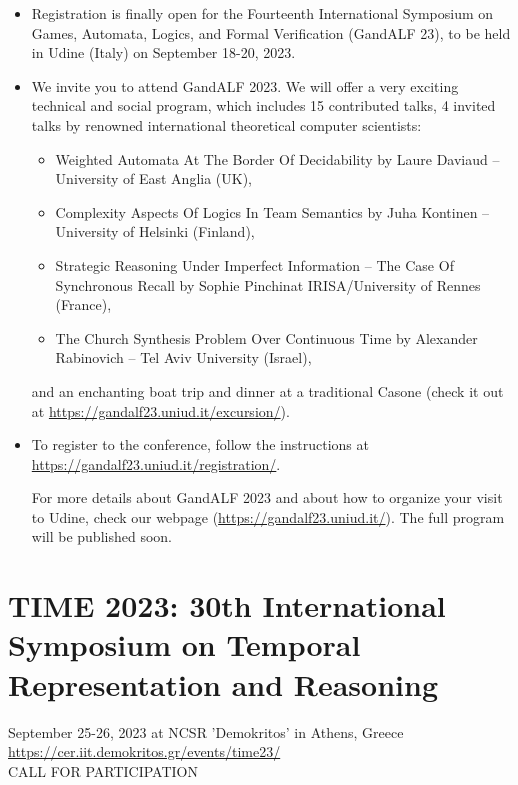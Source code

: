 \documentclass[prodmode,acmtecs]{acmsmall} %
\begin{document}
\begin{itemize}\item  Registration is finally open for the Fourteenth International Symposium on Games, Automata, Logics, and Formal Verification (GandALF 23), to be held in Udine (Italy) on September 18-20, 2023. 
 
\item  We invite you to attend GandALF 2023. We will offer a very exciting technical and social program, which includes 15 contributed talks, 4 invited talks by renowned international theoretical computer scientists: 
 
\begin{itemize}\item  Weighted Automata At The Border Of Decidability by Laure Daviaud – University of East Anglia (UK),
\item  Complexity Aspects Of Logics In Team Semantics by Juha Kontinen – University of Helsinki (Finland),
\item  Strategic Reasoning Under Imperfect Information – The Case Of Synchronous Recall by Sophie Pinchinat IRISA/University of Rennes (France),
\item  The Church Synthesis Problem Over Continuous Time by Alexander Rabinovich – Tel Aviv University (Israel),
\end{itemize} 
  and an enchanting boat trip and dinner at a traditional Casone (check it out at \href{https://gandalf23.uniud.it/excursion/}{https://gandalf23.uniud.it/excursion/}). 
 
\item  To register to the conference, follow the instructions at \href{https://gandalf23.uniud.it/registration/}{https://gandalf23.uniud.it/registration/}. 
 
   For more details about GandALF 2023 and about how to organize your visit to Udine, check our webpage (\href{https://gandalf23.uniud.it/}{https://gandalf23.uniud.it/}). The full program will be published soon. 
 
\end{itemize}\section{TIME 2023: 30th International Symposium on Temporal Representation and Reasoning}\label{TIME2023}  September 25-26, 2023 at NCSR 'Demokritos' in Athens, Greece\\ 
  \href{https://cer.iit.demokritos.gr/events/time23/}{https://cer.iit.demokritos.gr/events/time23/}\\ 
CALL FOR PARTICIPATION 
\end{document}
